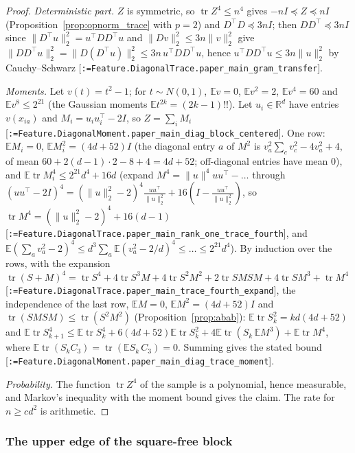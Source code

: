\documentclass[11pt]{article}
\makeatletter
\newcommand{\formal@break}[1]{\@tfor\formal@tok:=#1\do{%
  \formal@tok
  \expandafter\ifx\formal@tok.\allowbreak\else
  \expandafter\ifx\formal@tok\_\allowbreak\fi\fi}}
\DeclareRobustCommand{\formal}[1]{\textnormal{[\texttt{\small\formal@break{#1}}]}}
\newcommand{\R}{\mathbb{R}}
\newcommand{\E}{\mathbb{E}}
\newcommand{\norm}[1]{\lVert #1\rVert}
\newcommand{\tr}{\operatorname{tr}}
\newcommand{\Id}{I}
\theoremstyle{plain}
\theoremstyle{definition}
\makeatother
\begin{document}
\begin{proof}
\emph{Deterministic part.} $Z$ is symmetric, so $\tr Z^4 \le n^4$ gives
$-n\Id \preceq Z \preceq n\Id$ (Proposition~\ref{prop:opnorm_trace} with
$p = 2$) and $D^{\top}D \preceq 3n\Id$; then $DD^{\top} \preceq 3n\Id$ since
$\norm{D^{\top}u}_2^2 = u^{\top}DD^{\top}u$ and $\norm{Dv}_2^2 \le 3n\norm{v}_2^2$
give $\norm{DD^{\top}u}_2^2 = \norm{D(D^{\top}u)}_2^2 \le 3n\, u^{\top}DD^{\top}u$,
hence $u^{\top}DD^{\top}u \le 3n\norm{u}_2^2$ by Cauchy--Schwarz
\formal{Feature.DiagonalTrace.paper\_main\_gram\_transfer}.

\emph{Moments.} Let $v(t) = t^2 - 1$; for $t \sim N(0,1)$, $\E v = 0$,
$\E v^2 = 2$, $\E v^4 = 60$ and $\E v^8 \le 2^{21}$ (the Gaussian moments
$\E t^{2k} = (2k-1)!!$). Let $u_i \in \R^d$ have entries $v(x_{ia})$ and
$M_i = u_iu_i^{\top} - 2\Id$, so $Z = \sum_i M_i$
\formal{Feature.DiagonalMoment.paper\_main\_diag\_block\_centered}. One row:
$\E M_i = 0$, $\E M_i^2 = (4d + 52)\Id$ (the diagonal entry $a$ of $M^2$ is
$v_a^2\sum_c v_c^2 - 4v_a^2 + 4$, of mean $60 + 2(d-1)\cdot 2 - 8 + 4 = 4d + 52$;
off-diagonal entries have mean $0$), and
$\E\tr M_i^4 \le 2^{21}d^4 + 16d$ (expand $M^4 = \norm{u}^4 uu^{\top} - \ldots$
through $(uu^{\top} - 2\Id)^4 = (\norm{u}_2^2 - 2)^4 \frac{uu^{\top}}{\norm{u}_2^2} + 16(\Id - \frac{uu^{\top}}{\norm{u}_2^2})$, so
$\tr M^4 = (\norm{u}_2^2 - 2)^4 + 16(d - 1)$ \formal{Feature.DiagonalTrace.paper\_main\_rank\_one\_trace\_fourth},
and $\E(\sum_a v_a^2 - 2)^4 \le d^3\sum_a\E(v_a^2 - 2/d)^4 \le \ldots \le 2^{21}d^4$).
By induction over the rows, with the expansion
$\tr(S + M)^4 = \tr S^4 + 4\tr S^3M + 4\tr S^2M^2 + 2\tr SMSM + 4\tr SM^3 + \tr M^4$
\formal{Feature.DiagonalTrace.paper\_main\_trace\_fourth\_expand}, the
independence of the last row, $\E M = 0$, $\E M^2 = (4d+52)\Id$ and
$\tr(SMSM) \le \tr(S^2M^2)$ (Proposition~\ref{prop:abab}):
$\E\tr S_k^2 = kd(4d + 52)$ and
$\E\tr S_{k+1}^4 \le \E\tr S_k^4 + 6(4d+52)\E\tr S_k^2 + 4\E\tr(S_k\,\E M^3) + \E\tr M^4$,
where $\E\tr(S_kC_3) = \tr(\E S_k\, C_3) = 0$. Summing gives the stated bound
\formal{Feature.DiagonalMoment.paper\_main\_diag\_trace\_moment}.

\emph{Probability.} The function $\tr Z^4$ of the sample is a polynomial,
hence measurable, and Markov's inequality with the moment bound gives the
claim. The rate for $n \ge cd^2$ is arithmetic.
\end{proof}

\subsubsection{The upper edge of the square-free block}
\end{document}
